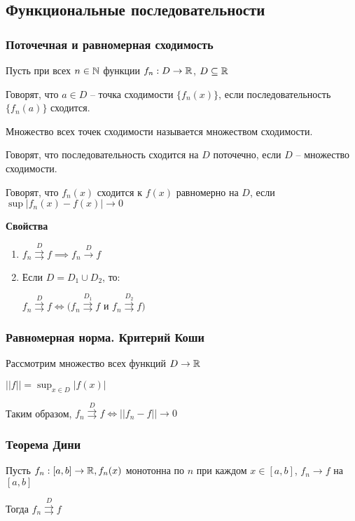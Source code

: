 \subsection{Функциональные последовательности}

\subsubsection{Поточечная и равномерная сходимость}

Пусть при всех $n \in \mathbb{N}$ функции $f_n: D \to \mathbb{R}$, $D \subseteq \mathbb{R}$

Говорят, что $a \in D$ -- точка сходимости $\{f_n(x)\}$, если последовательность $\{f_n(a)\}$ сходится.

Множество всех точек сходимости называется множеством сходимости.

Говорят, что последовательность сходится на $D$ поточечно, если $D$ -- множество сходимости.

Говорят, что $f_n(x)$ сходится к $f(x)$ равномерно на $D$, если $\sup|f_n(x) - f(x)| \to 0$

\textbf{Свойства}

\begin{enumerate}
    \item $f_n \overset{D}{\rightrightarrows} f \implies f_n \overset{D}{\rightarrow} f$
    \item Если $D = D_1 \cup D_2$, то:

          $f_n \overset{D}{\rightrightarrows} f \iff (f_n \overset{D_1}{\rightrightarrows} f $ и $f_n \overset{D_2}{\rightrightarrows} f)$
\end{enumerate}

\subsubsection{Равномерная норма. Критерий Коши}

Рассмотрим множество всех функций $D \to \mathbb{R}$

$||f|| = \sup_{x \in D} |f(x)|$

Таким образом, $f_n \overset{D}{\rightrightarrows} f \iff ||f_n - f|| \to 0$

\subsubsection{Теорема Дини}

Пусть $f_n: [a, b] \to \mathbb{R}, f_n(x)$ монотонна по $n$ при каждом $x \in [a, b]$, $f_n \to f$ на $[a, b]$

Тогда $f_n \overset{D}{\rightrightarrows} f$